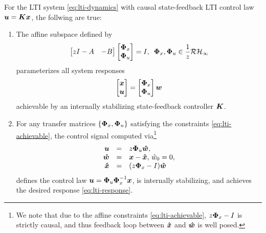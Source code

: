 \begin{theorem}\label{thm:lti-sls}
For the LTI system \eqref{eq:lti-dynamics} with causal state-feedback LTI control law $\boldsymbol{u} = \boldsymbol{K} \boldsymbol{x}$, the follwing are true:
\begin{enumerate}
\item The affine subspace defined by 
\begin{equation}
\begin{bmatrix} zI - A & - B \end{bmatrix} \begin{bmatrix} \boldsymbol{\Phi}_x \\ \boldsymbol{\Phi}_u \end{bmatrix} = I, \, \ \boldsymbol{\Phi}_x, \boldsymbol{\Phi}_u \in \frac{1}{z}\mathcal{RH}_\infty
\label{eq:lti-achievable}
\end{equation}
parameterizes all system responses
\begin{equation}
\begin{bmatrix} \boldsymbol{x} \\ \boldsymbol{u} \end{bmatrix} = \begin{bmatrix} \boldsymbol{\Phi}_x \\ \boldsymbol{\Phi}_u \end{bmatrix} \boldsymbol{w}
\label{eq:lti-response}
\end{equation}
achievable by an internally stabilizing state-feedback controller $\boldsymbol{K}$.
\item For any transfer matrices $\left\{\boldsymbol{\Phi}_x, \boldsymbol{\Phi}_u\right\}$ satisfying the constraints \eqref{eq:lti-achievable}, the control signal computed via\footnote{We note that due to the affine constraints \eqref{eq:lti-achievable}, $z\boldsymbol{\Phi}_x-I$ is strictly causal, and thus feedback loop between $\boldsymbol{\hat x}$ and $\boldsymbol{\hat w}$ is well posed.}
\begin{equation}
\begin{array}{rcl}
\boldsymbol{u} &=& z\boldsymbol{\Phi}_u \boldsymbol{\hat w},\\
 \boldsymbol{\hat w} &=& \boldsymbol{x} - \boldsymbol{\hat x}, \, \hat{w}_0 = 0, \\ 
\boldsymbol{\hat x} &=& (z\boldsymbol{\Phi}_x - I)\boldsymbol{\hat w}
\end{array}
\label{eq:lti-realization}
\end{equation}
defines the control law $\boldsymbol{u} = \boldsymbol{\Phi}_u\boldsymbol{\Phi}_x^{-1}\boldsymbol{x}$, is internally stabilizing, and achieves the desired response \eqref{eq:lti-response}.
\end{enumerate}
\end{theorem}

